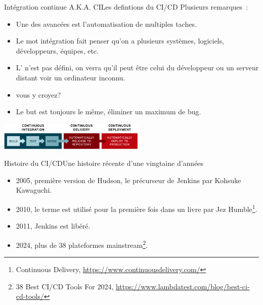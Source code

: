 \documentclass{beamer}
\begin{document}
    \begin{frame}{Intégration continue A.K.A. CI}{Les defintions du CI/CD}
        \transdissolve
        Plusieurs remarques~:
        \begin{itemize}
            \item Une des avancées est l'automatisation de multiples taches.
            \item Le mot intégration fait penser qu'on a plusieurs systèmes, logiciels, développeurs, équipes, etc.
            \item L' n'est pas défini, on verra qu'il peut être celui du développeur ou un serveur distant voir un ordinateur inconnu.
            \item {} vous y croyez?
            \item Le but est toujours le même, éliminer un maximum de bug.
        \end{itemize}
        \bigbreak
        \centering
        \includegraphics[width=7cm]{image/ci-cd-flow}
    \end{frame}

    \begin{frame}{Histoire du CI/CD}{Une histoire récente d'une vingtaine d'années}
        \transdissolve
        \begin{itemize}
            \item 2005, première version de Hudson, le précurseur de Jenkins par Kohsuke Kawaguchi.
            \item 2010, le terme  est utilisé pour la première fois dans un livre par Jez Humble\footnote{\label{ci}Continuous Delivery, \url{https://www.continuousdelivery.com/}}.
            \item 2011, Jenkins est libéré.
            \item 2024, plus de 38 plateformes mainstream\footnote{38 Best CI/CD Tools For 2024, \url{https://www.lambdatest.com/blog/best-ci-cd-tools/}}.
        \end{itemize}
    \end{frame}
\end{document}
